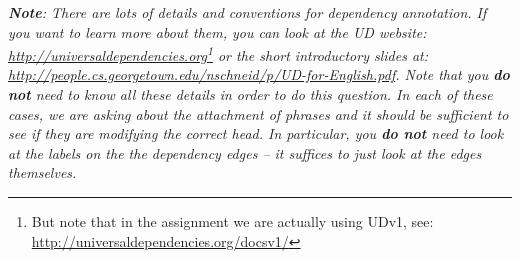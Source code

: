 \begin{parts}
    \textit{\textbf{Note}:
        There are lots of details and conventions for dependency annotation.
        If you want to learn more about them, you can look at the UD website: \url{http://universaldependencies.org}\footnote{But note that in the assignment we are actually using UDv1, see: \url{http://universaldependencies.org/docsv1/}} or the short introductory slides at: \url{http://people.cs.georgetown.edu/nschneid/p/UD-for-English.pdf}.
        Note that you \textbf{do not} need to know all these details in order to do this question. In each of these cases, we are asking about the attachment of phrases and it should be sufficient to see if they are modifying the correct head.
        In particular, you \textbf{do not} need to look at the labels on the the dependency edges -- it suffices to just look at the edges themselves. }

    \medskip

    


\end{parts}

